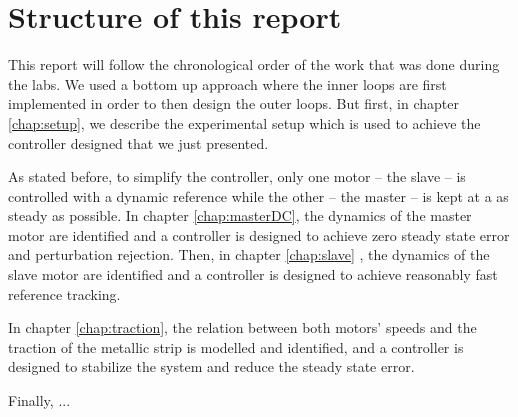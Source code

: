 \section{Structure of this report}
This report will follow the chronological order of the work that was done during the labs. We used a bottom up approach where the inner loops are first implemented in order to then design the outer loops. But first, in chapter \ref{chap:setup}, we describe the experimental setup which is used to achieve the controller designed that we just presented.

As stated before, to simplify the controller, only one motor -- the slave -- is controlled with a dynamic reference while the other -- the master -- is kept at a as steady as possible. In chapter \ref{chap:masterDC}, the dynamics of the master motor are identified and a controller is designed to achieve zero steady state error and perturbation rejection. Then, in chapter \ref{chap:slave} , the dynamics of the slave motor are identified and a controller is designed to achieve reasonably fast reference tracking.

In chapter \ref{chap:traction}, the relation between both motors' speeds and the traction of the metallic strip is modelled and identified, and a controller is designed to stabilize the system and reduce the steady state error.

Finally, ... 





